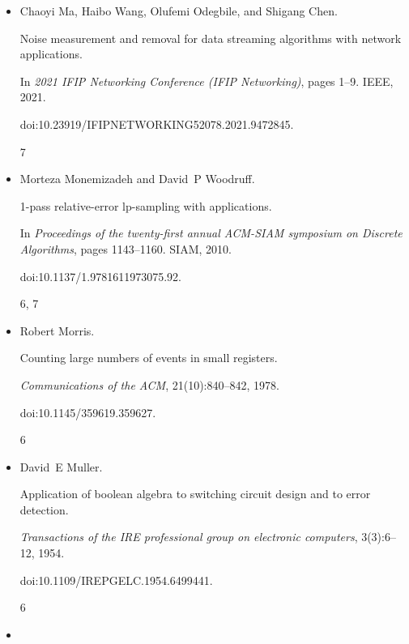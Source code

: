 \documentclass[10pt,a4paper]{article}
\begin{document}
\begin{itemize}
In \emph{60th Annual Symposium on Foundations of Computer Science
(FOCS)}, 2019.


6




\item[] 
[21]

Chaoyi Ma, Haibo Wang, Olufemi Odegbile, and Shigang Chen.


Noise measurement and removal for data streaming algorithms with
network applications.


In \emph{2021 IFIP Networking Conference (IFIP Networking)}, pages
1–9. IEEE, 2021.


doi:10.23919/IFIPNETWORKING52078.2021.9472845.


7




\item[] 
[22]

Morteza Monemizadeh and David P Woodruff.


1-pass relative-error lp-sampling with applications.


In \emph{Proceedings of the twenty-first annual ACM-SIAM symposium on
Discrete Algorithms}, pages 1143–1160. SIAM, 2010.


doi:10.1137/1.9781611973075.92.


6, 7




\item[] 
[23]

Robert Morris.


Counting large numbers of events in small registers.


\emph{Communications of the ACM}, 21(10):840–842, 1978.


doi:10.1145/359619.359627.


6




\item[] 
[24]

David E Muller.


Application of boolean algebra to switching circuit design and to
error detection.


\emph{Transactions of the IRE professional group on electronic
computers}, 3(3):6–12, 1954.


doi:10.1109/IREPGELC.1954.6499441.


6




\item[] 
[25]


\end{itemize}
\end{document}
